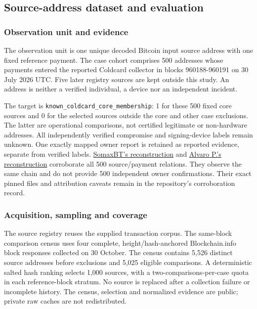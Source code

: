 \begingroup
\setlength{\emergencystretch}{2em}
\hypertarget{source-address-dataset-and-evaluation}{%
\subsection{Source-address dataset and
evaluation}\label{source-address-dataset-and-evaluation}}

\hypertarget{observation-unit-and-evidence}{%
\subsubsection{Observation unit and
evidence}\label{observation-unit-and-evidence}}

The observation unit is one unique decoded Bitcoin input source address
with one fixed reference payment. The case cohort comprises 500
addresses whose payments entered the reported Coldcard collector in
blocks 960188-960191 on 30 July 2026 UTC. Five later registry sources
are kept outside this study. An address is neither a verified
individual, a device nor an independent incident.

The target is \texttt{known\_\allowbreak{}coldcard\_\allowbreak{}core\_\allowbreak{}membership}: 1 for these
500 fixed core sources and 0 for the selected sources outside the core
and other case exclusions. The latter are operational comparisons, not
certified legitimate or non-hardware addresses. All independently
verified compromise and signing-device labels remain unknown. One
exactly mapped owner report is retained as reported evidence, separate
from verified labels.
\href{https://github.com/somaxbt/coldcard-drain-addresses/tree/1e7fef87060808c29beaf9d137eb5ff9e37f8811}{SomaxBT's
reconstruction} and
\href{https://github.com/alva-p/coldcard-weak-rng-research/tree/f93cfed16302bb91c8409fdee9ce5576a34b7e52}{Alvaro
P.'s reconstruction} corroborate all 500 source/payment relations. They
observe the same chain and do not provide 500 independent owner
confirmations. Their exact pinned files and attribution caveats remain
in the repository's corroboration record.

\hypertarget{acquisition-sampling-and-coverage}{%
\subsubsection{Acquisition, sampling and
coverage}\label{acquisition-sampling-and-coverage}}

The source registry reuses the supplied transaction corpus. The
same-block comparison census uses four complete, height/hash-anchored
Blockchain.info block responses collected on 30 October. The census
contains 5,526 distinct source addresses before exclusions and 5,025
eligible comparisons. A deterministic salted hash ranking selects 1,000
sources, with a two-comparisons-per-case quota in each reference-block
stratum. No source is replaced after a collection failure or incomplete
history. The census, selection and normalized evidence are public;
private raw caches are not redistributed.

